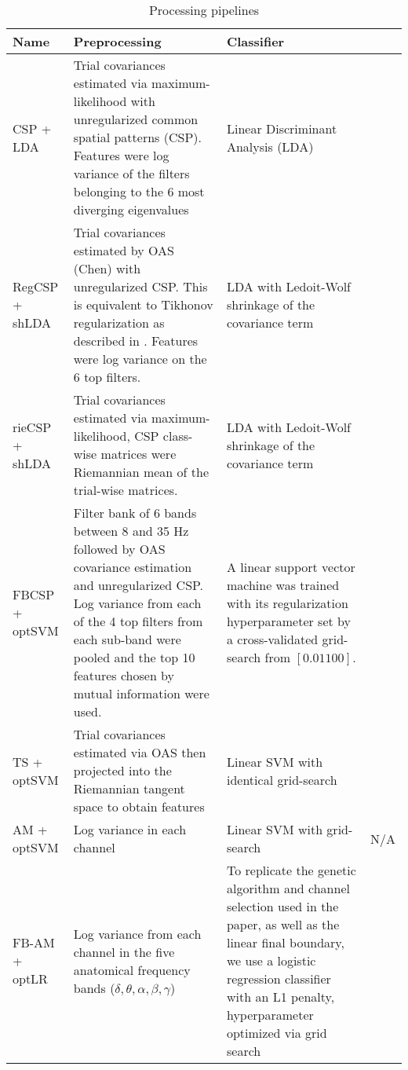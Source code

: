 \begin{table*}
  \centering
  \begin{tabular}{ l || p{6cm} | p{6cm} | c | }
    
    Name & Preprocessing & Classifier \\ \hline
    CSP + LDA & Trial covariances estimated via maximum-likelihood with unregularized common spatial patterns (CSP). Features were log variance of the filters belonging to the 6 most diverging eigenvalues & Linear Discriminant Analysis (LDA) & \cite{Koles1990} \\ \hline
    RegCSP + shLDA & Trial covariances estimated by OAS (Chen) with
                     unregularized CSP. This is equivalent to Tikhonov
                     regularization as described in \cite{Lotte2011}. Features were log variance on the 6 top filters. & LDA with Ledoit-Wolf shrinkage of the covariance term  & \cite{Lotte2011} \\ \hline
    rieCSP + shLDA & Trial covariances estimated via maximum-likelihood, CSP class-wise matrices were Riemannian mean of the trial-wise matrices. & LDA with Ledoit-Wolf shrinkage of the covariance term  & \cite{TODO} \\ \hline
    FBCSP + optSVM & Filter bank of 6 bands between 8 and 35 Hz followed by OAS covariance estimation and unregularized CSP. Log variance from each of the 4 top filters from each sub-band were pooled and the top 10 features chosen by mutual information were used. & A linear support vector machine was trained with its regularization hyperparameter set by a cross-validated grid-search from $[0.01 100]$. & \cite{KaiKengAng2008} \\ \hline
    TS + optSVM & Trial covariances estimated via OAS then projected into the Riemannian tangent space to obtain features & Linear SVM with identical grid-search & \cite{Barachant2013} \\ \hline
    AM + optSVM & Log variance in each channel & Linear SVM with grid-search & N/A \\ \hline
    FB-AM + optLR & Log variance from each channel in the five anatomical frequency bands ($\delta, \theta, \alpha, \beta, \gamma$) & To replicate the genetic algorithm and channel selection used in the paper, as well as the linear final boundary, we use a logistic regression classifier with an L1 penalty, hyperparameter optimized via grid search& \cite{Garrett2003} \\
    
  \end{tabular}
  \caption{Processing pipelines}
  \label{tab:pipelines}
\end{table*}
  

